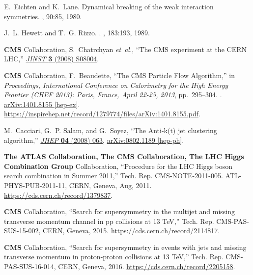 \begin{thebibliography}{99}
E.~Eichten and K.~Lane.
\newblock Dynamical breaking of the weak interaction symmetries.
, 90:85, 1980.


J.~L. Hewett and T.~G. Rizzo.
.
, 183:193, 1989.




{\bfseries CMS} Collaboration, S.~Chatrchyan {\em et~al.}, ``{The CMS
  experiment at the CERN LHC},''
\href{http://dx.doi.org/10.1088/1748-0221/3/08/S08004}{{\em JINST} {\bfseries
  3} (2008) S08004}.

{\bfseries CMS} Collaboration, F.~Beaudette, ``{The CMS Particle Flow
  Algorithm},'' in {\em {Proceedings, International Conference on Calorimetry
  for the High Energy Frontier (CHEF 2013): Paris, France, April 22-25, 2013}},
  pp.~295--304.
.
\newblock \href{http://arxiv.org/abs/1401.8155}{{\ttfamily arXiv:1401.8155
  [hep-ex]}}.
\newblock
\url{https://inspirehep.net/record/1279774/files/arXiv:1401.8155.pdf}.
\newblock

M.~Cacciari, G.~P. Salam, and G.~Soyez, ``{The Anti-k(t) jet clustering
  algorithm},'' \href{http://dx.doi.org/10.1088/1126-6708/2008/04/063}{{\em
  JHEP} {\bfseries 04} (2008) 063},
\href{http://arxiv.org/abs/0802.1189}{{\ttfamily arXiv:0802.1189 [hep-ph]}}.

{\bfseries The ATLAS Collaboration, The CMS Collaboration, The LHC Higgs
  Combination Group} Collaboration, ``{Procedure for the LHC Higgs boson search
  combination in Summer 2011},'' Tech. Rep. CMS-NOTE-2011-005.
  ATL-PHYS-PUB-2011-11, CERN, Geneva, Aug, 2011.
\newblock \url{https://cds.cern.ch/record/1379837}.

{\bfseries CMS} Collaboration, ``{Search for supersymmetry in the multijet and
  missing transverse momentum channel in pp collisions at 13 TeV},'' Tech. Rep.
  CMS-PAS-SUS-15-002, CERN, Geneva, 2015.
\newblock \url{https://cds.cern.ch/record/2114817}.

{\bfseries CMS} Collaboration, ``{Search for supersymmetry in events with jets
  and missing transverse momentum in proton-proton collisions at 13 TeV},''
  Tech. Rep. CMS-PAS-SUS-16-014, CERN, Geneva, 2016.
\newblock \url{https://cds.cern.ch/record/2205158}.


\end{thebibliography}
